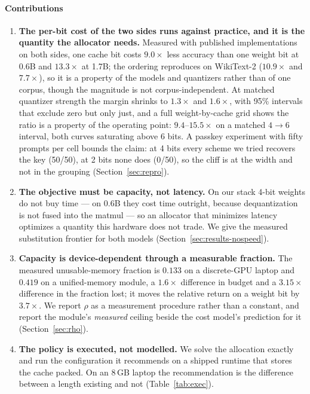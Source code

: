 \documentclass[10pt,journal]{IEEEtran}
\newcommand{\rhoSym}{\rho}
\begin{document}
\paragraph*{Contributions}
\begin{enumerate}
\item \textbf{The per-bit cost of the two sides runs against practice, and it is
      the quantity the allocator needs.} Measured with published implementations
      on both sides, one cache bit costs $9.0\times$ less accuracy than one
      weight bit at 0.6B and $13.3\times$ at 1.7B; the ordering reproduces on
      WikiText-2 ($10.9\times$ and $7.7\times$), so it is a property of the
      models and quantizers rather than of one corpus, though the magnitude is
      not corpus-independent. At matched quantizer strength the margin shrinks
      to $1.3\times$ and $1.6\times$, with 95\% intervals that exclude zero but
      only just, and a full weight-by-cache grid shows the ratio is a property of
      the operating point: $9.4$--$15.5\times$ on a matched $4{\to}6$ interval, both
      curves saturating above 6 bits. A passkey experiment with fifty prompts per cell
      bounds the claim: at 4 bits every scheme we tried recovers the key
      (50/50), at 2 bits none does (0/50), so the cliff is at the width and not
      in the grouping (Section~\ref{sec:repro}).

\item \textbf{The objective must be capacity, not latency.} On our stack 4-bit
      weights do not buy time --- on 0.6B they cost time outright, because
      dequantization is not fused into the matmul --- so an allocator that
      minimizes latency optimizes a quantity this hardware does not trade. We
      give the measured substitution frontier for both models
      (Section~\ref{sec:results-nospeed}).

\item \textbf{Capacity is device-dependent through a measurable fraction.} The
      measured unusable-memory fraction is $0.133$ on a discrete-GPU laptop and
      $0.419$ on a unified-memory module, a $1.6\times$ difference in budget and a
      $3.15\times$ difference in the fraction lost; it moves the relative return on a
      weight bit by $3.7\times$. We report $\rhoSym$ as a measurement procedure
      rather than a constant, and report the module's \emph{measured} ceiling
      beside the cost model's prediction for it (Section~\ref{sec:rho}).

\item \textbf{The policy is executed, not modelled.} We solve the allocation
      exactly and run the configuration it recommends on a shipped runtime that
      stores the cache packed. On an 8\,GB laptop the recommendation is the
      difference between a length existing and not (Table~\ref{tab:exec}).


\end{enumerate}
\end{document}
